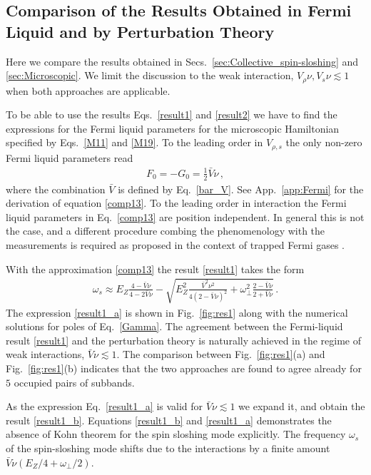 \subsection{Comparison of the Results Obtained in Fermi Liquid and by Perturbation Theory}
\label{sec:Comparison}
Here we compare the results obtained in Secs.~\ref{sec:Collective_spin-sloshing} and \ref{sec:Microscopic}.
We limit the discussion to the weak interaction, $V_{\rho}\nu, V_s \nu \lesssim 1$ when both approaches are applicable.

To be able to use the results Eqs.~\eqref{result1} and \eqref{result2} we have to find the expressions for the Fermi liquid parameters for the microscopic Hamiltonian specified by Eqs.~\eqref{M11} and \eqref{M19}. 
To the leading order in $V_{\rho,s}$ the only non-zero Fermi liquid parameters read 
\begin{align}\label{comp13}
F_0 = - G_0 = \frac{1}{2} \bar{V} \nu\, ,
\end{align}
where the combination $\bar{V}$ is defined by Eq.~\eqref{bar_V}.
See App.~\ref{app:Fermi} for the derivation of equation \eqref{comp13}.
To the leading order in interaction the Fermi liquid parameters in Eq.~\eqref{comp13} are position independent.
In general this is not the case, and a different procedure combing the phenomenology with the measurements is required as proposed in the context of trapped Fermi gases \cite{Chien2010}.

With the approximation \eqref{comp13} the result \eqref{result1} takes the form
\begin{align}\label{result1_a}
\omega_s \approx 
E_Z\frac{4 - \bar{V}\nu}{4 - 2\bar{V} \nu}  - \sqrt{ E_Z^2 \frac{ \bar{V}^2 \nu^2}{4( 2 - \bar{V}\nu)^2} + \omega_{\perp}^2 \frac{ 2 -\bar{V}\nu}{2 + \bar{V}\nu} }\, .
\end{align}
The expression \eqref{result1_a} is shown in Fig.~\ref{fig:res1} along with the numerical solutions for poles of Eq.~\eqref{Gamma}.
The agreement between the Fermi-liquid result \eqref{result1} and the perturbation theory is naturally achieved in the regime of weak interactions, $\bar{V}\nu \lesssim 1$.
The comparison between Fig.~\ref{fig:res1}(a) and Fig.~\ref{fig:res1}(b) indicates that the two approaches are found to agree already for $5$ occupied pairs of subbands. 

As the expression Eq.~\eqref{result1_a} is valid for $\bar{V} \nu \lesssim 1$ we expand it, and obtain the result \eqref{result1_b}.
Equations  \eqref{result1_b} and \eqref{result1_a} demonstrates the absence of Kohn theorem for the spin sloshing mode explicitly.
The frequency $\omega_s$ of the spin-sloshing mode shifts due to the interactions by a finite amount $\bar{V} \nu ( E_Z/4 + \omega_{\perp}/2 )$.


